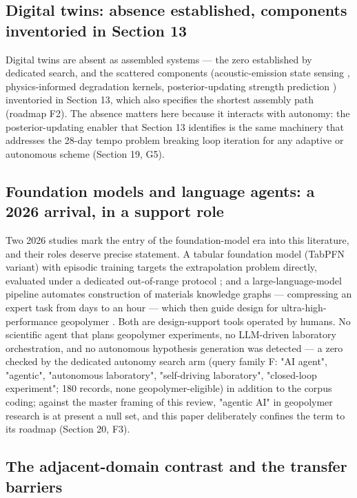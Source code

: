 \documentclass[pdflatex,sn-basic]{sn-jnl}
\begin{document}
\subsection{Digital twins: absence established, components inventoried in Section 13}

Digital twins are absent as assembled systems --- the zero established by dedicated search, and the scattered components (acoustic-emission state sensing \citep{jin2024}, physics-informed degradation kernels, posterior-updating strength prediction \citep{chan2026}) inventoried in Section 13, which also specifies the shortest assembly path (roadmap F2). The absence matters here because it interacts with autonomy: the posterior-updating enabler that Section 13 identifies is the same machinery that addresses the 28-day tempo problem breaking loop iteration for any adaptive or autonomous scheme (Section 19, G5).

\subsection{Foundation models and language agents: a 2026 arrival, in a support role}

Two 2026 studies mark the entry of the foundation-model era into this literature, and their roles deserve precise statement. A tabular foundation model (TabPFN variant) with episodic training targets the extrapolation problem directly, evaluated under a dedicated out-of-range protocol \citep{zhang2026}; and a large-language-model pipeline automates construction of materials knowledge graphs --- compressing an expert task from days to an hour --- which then guide design for ultra-high-performance geopolymer \citep{jiang2026}. Both are design-support tools operated by humans. No scientific agent that plans geopolymer experiments, no LLM-driven laboratory orchestration, and no autonomous hypothesis generation was detected --- a zero checked by the dedicated autonomy search arm (query family F: "AI agent", "agentic", "autonomous laboratory", "self-driving laboratory", "closed-loop experiment"; 180 records, none geopolymer-eligible) in addition to the corpus coding; against the master framing of this review, "agentic AI" in geopolymer research is at present a null set, and this paper deliberately confines the term to its roadmap (Section 20, F3).

\subsection{The adjacent-domain contrast and the transfer barriers}
\end{document}
